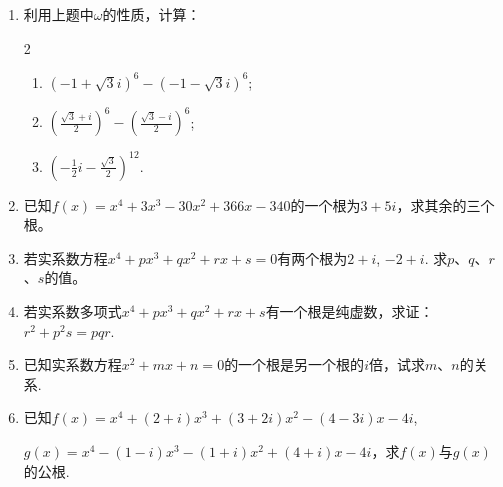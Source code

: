 \begin{enumerate}
\begin{enumerate}[(1)]
    \item $a^3+b^3=(a+b)(a\omega+b\omega^2)(a\omega^2+b\omega);$
    \item $a^{3}+b^{3}+c^{3}-3abc =(a+b+c)(a+b\omega+c\omega^{2})(a+b\omega^{2}+c\omega)$
\end{enumerate}

\item 利用上题中$\omega$的性质，计算：
\begin{multicols}{2}
\begin{enumerate}[(1)]
    \item $(-1+\sqrt{3}i)^{6}-(-1-\sqrt{3}i)^{6}$;
    \item $\left(\frac{\sqrt{3}+i}{2}\right)^{6}-\left(\frac{\sqrt{3}-i}{2}\right)^{6}$;
    \item $\left(-\frac{1}{2}i-\frac{\sqrt{3}}{2}\right)^{12}$.
\end{enumerate}    
\end{multicols}

\item 已知$f(x)=x^4+3x^3-30x^2+366x-340$的一个根为$3+5i$，求其余的三个根。
\item 若实系数方程$x^4+px^3+qx^2+rx+s=0$有两个根为$2+i$, $-2+i$. 求$p$、$q$、$r$、$s$的值。
\item 若实系数多项式$x^4+px^3+qx^2+rx+s$有一个根是纯虚数，求证：$r^2+p^2s=pqr$.

\item 已知实系数方程$x^2+mx+n=0$的一个根是另一个根的$i$倍，试求$m$、$n$的关系.
\item 已知$f(x)=x^4+(2+i)x^3+(3+2i)x^2-(4-3i)x-4i$, 

$g(x)=x^4-(1-i)x^3-(1+i)x^2+(4+i)x-4i$，求$f(x)$与$g(x)$的公根.
\end{enumerate}
